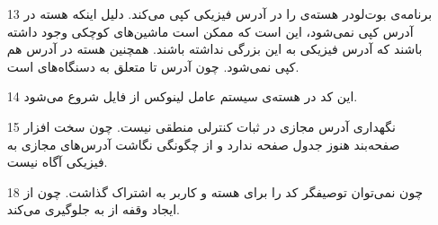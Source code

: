 \begin{itemize}
	\item [13]
	برنامه‌ی بوت‌لودر هسته‌ی 
	را در آدرس فیزیکی 
	کپی می‌کند. دلیل اینکه هسته در آدرس 
	کپی نمی‌شود، این است که ممکن است ماشین‌های کوچکی وجود داشته باشند که آدرس فیزیکی به این بزرگی نداشته باشند. همچنین هسته در آدرس 
	هم کپی نمی‌شود. چون آدرس 
	تا 
	متعلق به دسنگاه‌های 
	است.
	\item [14]
	این کد در هسته‌ی سیستم عامل لینوکس از فایل 
	شروع می‌شود.
	\item [15]
	نگهداری آدرس مجازی در ثبات کنترلی 
	منطقی نیست. چون سخت افزار صفحه‌بند هنوز جدول صفحه ندارد و از چگونگی نگاشت آدرس‌های مجازی به فیزیکی آگاه نیست.
	\item [18]
	چون نمی‌توان توصیفگر کد را برای هسته و کاربر به اشتراک گذاشت. چون 
	از ایجاد وقفه از 
	به 
	جلوگیری می‌کند.
\end{itemize}